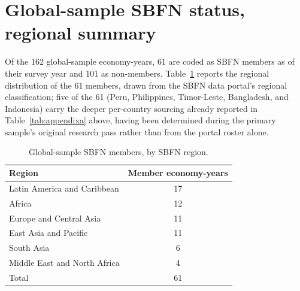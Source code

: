 \documentclass[12pt]{article}
\begin{document}
\section{Global-sample SBFN status, regional summary}
\label{app:globalsbfn}

Of the 162 global-sample economy-years, 61 are coded as SBFN members as of their survey year and 101
as non-members. Table~\ref{tab:globalsbfnregion} reports the regional distribution of the 61
members, drawn from the SBFN data portal's regional classification; five of the 61 (Peru,
Philippines, Timor-Leste, Bangladesh, and Indonesia) carry the deeper per-country sourcing already
reported in Table~\ref{tab:appendixa} above, having been determined during the primary sample's
original research pass rather than from the portal roster alone.

\begin{table}[htbp]
\centering
\caption{Global-sample SBFN members, by SBFN region.}
\label{tab:globalsbfnregion}
\begin{tabular}{lc}
\toprule
Region & Member economy-years \\
\midrule
Latin America and Caribbean & 17 \\
Africa & 12 \\
Europe and Central Asia & 11 \\
East Asia and Pacific & 11 \\
South Asia & 6 \\
Middle East and North Africa & 4 \\
\midrule
Total & 61 \\
\bottomrule
\end{tabular}
\end{table}
\end{document}

